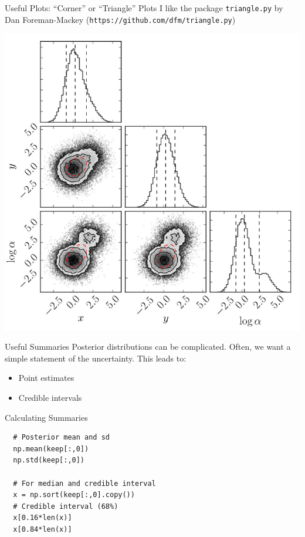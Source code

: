 \begin{frame}[t]{Useful Plots: ``Corner'' or ``Triangle'' Plots}
I like the package {\tt triangle.py} by Dan Foreman-Mackey
({\tt https://github.com/dfm/triangle.py})
\begin{center}
\includegraphics[scale=0.2]{triangle.png}
\end{center}
\end{frame}


\begin{frame}[t]{Useful Summaries}
Posterior distributions can be complicated. Often, we want a simple statement
of the uncertainty. This leads to:

\begin{itemize}
\item Point estimates
\item Credible intervals
\end{itemize}
\end{frame}


\begin{frame}[t, fragile]{Calculating Summaries}
\begin{verbatim}
  # Posterior mean and sd
  np.mean(keep[:,0])
  np.std(keep[:,0])

  # For median and credible interval
  x = np.sort(keep[:,0].copy())
  # Credible interval (68%)
  x[0.16*len(x)]
  x[0.84*len(x)]
\end{verbatim}
\end{frame}

